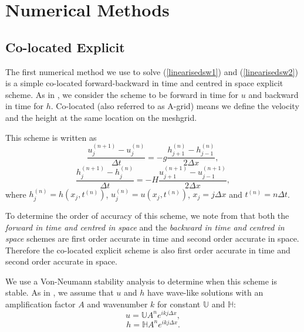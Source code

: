 \documentclass[a4paper, 10pt, notitlepage]{article}
\begin{document}
\section{Numerical Methods}\label{numericalmethodssection}

\subsection {Co-located Explicit}
The first numerical method we use to solve (\ref{linearisedsw1}) and (\ref{linearisedsw2}) is a simple co-located forward-backward in time and centred in space explicit scheme. As in \cite{MPE textbook}, we consider the scheme to be forward in time for $u$ and backward in time for $h$. Co-located (also referred to as A-grid) means we define the velocity and the height at the same location on the meshgrid.

This scheme is written as 
\begin{equation} \label{FTCSAgrid}
\frac{u_{j}^{(n+1)} - u_{j}^{(n)}}{\Delta t} = -g \frac{h_{j+1}^{(n)} - h_{j-1}^{(n)}}{2\Delta x},
\end{equation}
\begin{equation}\label{BTCSAgrid}
\frac{h_{j}^{(n+1)} - h_{j}^{(n)}}{\Delta t} = -H \frac{u_{j+1}^{(n+1)} - u_{j-1}^{(n+1)}}{2\Delta x},
\end{equation}
where $h_{j}^{(n)} = h(x_{j}, t^{(n)})$, $u_{j}^{(n)} = u(x_{j}, t^{(n)})$, $x_{j} = j\Delta x$ and $t^{(n)} = n\Delta t$. 

To determine the order of accuracy of this scheme, we note from \cite{MPE textbook} that both the \textit{forward in time and centred in space} and the \textit{backward in time and centred in space} schemes are first order accurate in time and second order accurate in space. Therefore the co-located explicit scheme is also first order accurate in time and second order accurate in space.

We use a Von-Neumann stability analysis to determine when this scheme is stable. As in \cite{MPE textbook}, we assume that $u$ and $h$ have wave-like solutions with an amplification factor $A$ and wavenumber $k$ for constant $\mathbb{U}$ and $\mathbb{H}$:
\begin{equation} \label{wavelikeu}
u  =  \mathbb{U}  A^{n} e^{ikj\Delta x},
\end{equation}
\begin{equation} \label{wavelikeh}
h  =  \mathbb{H} A^{n} e^{ikj\Delta x}.
\end{equation}
\end{document}
